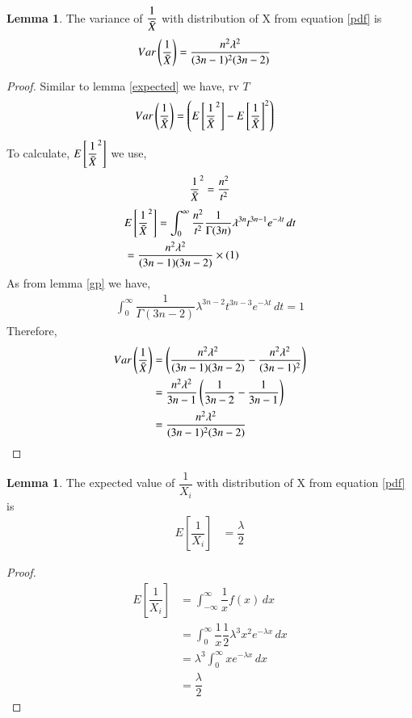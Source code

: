 \documentclass[journal,12pt,twocolumn]{IEEEtran}
\theoremstyle{definition}
\newtheorem{lemma}[theorem]{Lemma}
\begin{document}
\begin{lemma}
\label{var}
The variance of $ \dfrac{1}{\Bar{X}} $ with distribution of X from equation \eqref{pdf} is
\begin{align}
    Var\left(\dfrac{1}{\Bar{X}}\right) &= \dfrac{n^2\lambda^2}{(3n-1)^2(3n-2)}
\end{align}
\end{lemma}
\begin{proof}
 Similar to lemma \ref{expected} we have, rv $ T$
 \begin{align}
   Var\left(\dfrac{1}{\Bar{X}}\right)    &=  \left( E \left[   {\dfrac{1}{\Bar{X}}}^2  \right] - { E \left[   \dfrac{1}{\Bar{X}}  \right]}^2\right)
 \end{align}
 To calculate, $E \left[   {\dfrac{1}{\Bar{X}}}^2  \right] $ we use,
 \begin{align}
      {\dfrac{1}{\Bar{X}}}^2 = \dfrac{n^2}{t^2}
 \end{align}
 \begin{align}
    &  E \left[   {\dfrac{1}{\Bar{X}}}^2  \right] = \int_{0}^{\infty} \dfrac{n^2}{t^2} \dfrac{1}{\Gamma(3n)} \lambda^{3n}t^{3n-1}e^{-\lambda t}\,dt \\
      &= \dfrac{n^2\lambda^2}{(3n-1)(3n-2)} \times (1)
 \end{align}
 As from lemma \ref{gp} we have,
 \begin{align}
     \int_{0}^{\infty} \dfrac{1}{\Gamma(3n-2)} \lambda^{3n-2}t^{3n-3}e^{-\lambda t}\,dt = 1
 \end{align}
Therefore,
\begin{align}
    Var\left(\dfrac{1}{\Bar{X}}\right) &= \left(\dfrac{n^2\lambda^2}{(3n-1)(3n-2)} - \dfrac{n^2\lambda^2}{(3n-1)^2}\right) \\
    &= \dfrac{n^2\lambda^2}{3n-1} \left(\dfrac{1}{3n-2}- \dfrac{1}{3n-1}\right) \\
    &= \dfrac{n^2\lambda^2}{(3n-1)^2(3n-2)}
\end{align}
\end{proof}
\begin{lemma}
\label{exxi}
The expected value of $ \dfrac{1}{X_i} $ with distribution of X from equation \eqref{pdf} is
\begin{align}
    E  \left[ \dfrac{1}{X_i}  \right] &= \dfrac{\lambda}{2}
\end{align}
\end{lemma}
\begin{proof}
\begin{align}
     E  \left[ \dfrac{1}{X_i}  \right] &= \int_{-\infty}^{\infty} \dfrac{1}{x} f(x)\,dx \\
   & =  \int_{0}^{\infty} \dfrac{1}{x} \dfrac{1}{2} \lambda^3x^2e^{-\lambda x}\,dx \\
    & = \lambda^3  \int_{0}^{\infty}  x e^{-\lambda x}\,dx \\
    &= \dfrac{\lambda}{2}
\end{align}
  
\end{proof}
\end{document}
